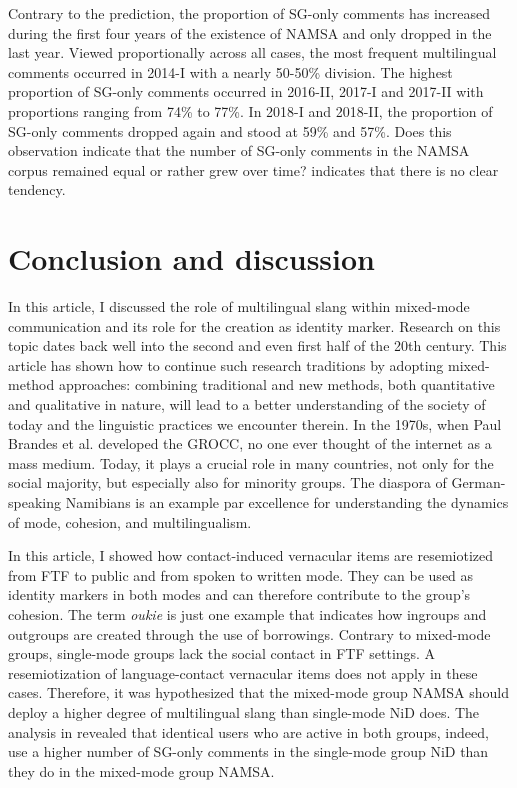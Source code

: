 \documentclass[output=paper]{langsci/langscibook}
\begin{document}
Contrary to the prediction, the proportion of SG-only comments has increased during the first four years of the existence of NAMSA and only dropped in the last year. Viewed proportionally across all cases, the most frequent multilingual comments occurred in 2014-I with a nearly 50-50\% division. The highest proportion of SG-only comments occurred in 2016-II, 2017-I and 2017-II with proportions ranging from 74\% to 77\%. In 2018-I and 2018-II, the proportion of SG-only comments dropped again and stood at 59\% and 57\%. Does this observation indicate that the number of SG-only comments in the NAMSA corpus remained equal or rather grew over time?  indicates that there is no clear tendency.

 
\section{Conclusion and discussion}
 \label{sec:radke:5}

In this article, I discussed the role of multilingual slang within mixed-mode communication and its role for the creation as identity marker. Research on this topic dates back well into the second and even first half of the 20th century. This article has shown how to continue such research traditions by adopting mixed-method approaches: combining traditional and new methods, both quantitative and qualitative in nature, will lead to a better understanding of the society of today and the linguistic practices we encounter therein. In the 1970s, when Paul Brandes et al. developed the GROCC, no one ever thought of the internet as a mass medium. Today, it plays a crucial role in many countries, not only for the social majority, but especially also for minority groups. The diaspora of German-speaking Namibians is an example par excellence for understanding the dynamics of mode, cohesion, and multilingualism. 

In this article, I showed how contact-induced vernacular items are resemiotized from FTF to public and from spoken to written mode. They can be used as identity markers in both modes and can therefore contribute to the group’s cohesion. The term \textit{oukie} is just one example that indicates how ingroups and outgroups are created through the use of borrowings. Contrary to mixed-mode groups, single-mode groups lack the social contact in FTF settings. A resemiotization of language-contact vernacular items does not apply in these cases. Therefore, it was hypothesized that the mixed-mode group NAMSA should deploy a higher degree of multilingual slang than single-mode NiD does. The analysis in  revealed that identical users who are active in both groups, indeed, use a higher number of SG-only comments in the single-mode group NiD than they do in the mixed-mode group NAMSA.
\end{document}
